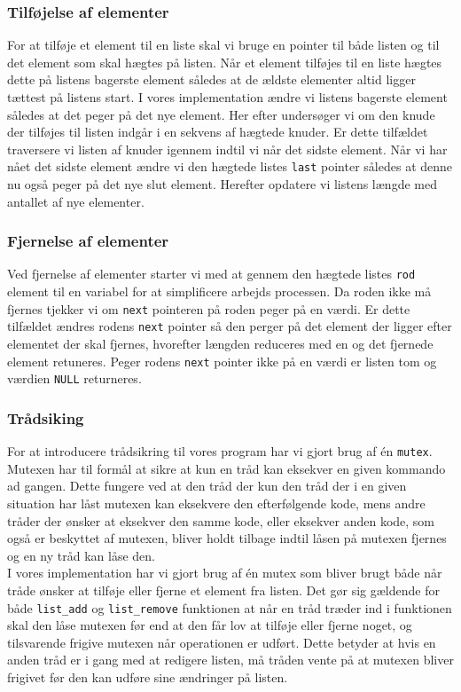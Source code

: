 \documentclass[main.tex]{subfile}
\begin{document}
\subsubsection{Tilføjelse af elementer}
For at tilføje et element til en liste skal vi bruge en pointer til både listen og til det element som skal hægtes på listen. Når et element tilføjes til en liste hægtes dette på listens bagerste element således at de ældste elementer altid ligger tættest på listens start. I vores implementation ændre vi listens bagerste element således at det peger på det nye element. Her efter undersøger vi om den knude der tilføjes til listen indgår i en sekvens af hægtede knuder. Er dette tilfældet traversere vi listen af knuder igennem indtil vi når det sidste element. Når vi har nået det sidste element ændre vi den hægtede listes \texttt{last} pointer således at denne nu også peger på det nye slut element. Herefter opdatere vi listens længde med antallet af nye elementer. 

\subsubsection{Fjernelse af elementer}
Ved fjernelse af elementer starter vi med at gennem den hægtede listes \texttt{rod} element til en variabel for at simplificere arbejds processen. Da roden ikke må fjernes tjekker vi om \texttt{next} pointeren på roden peger på en værdi. Er dette tilfældet ændres rodens \texttt{next} pointer så den perger på det element der ligger efter elementet der skal fjernes, hvorefter længden reduceres med en og det fjernede element retuneres. Peger rodens \texttt{next} pointer ikke på en værdi er listen tom og værdien \texttt{NULL} returneres.

\subsubsection{Trådsiking}
For at introducere trådsikring til vores program har vi gjort brug af én \texttt{mutex}. Mutexen har til formål at sikre at kun en tråd kan eksekver en given kommando ad gangen. Dette fungere ved at den tråd der kun den tråd der i en given situation har låst mutexen kan eksekvere den efterfølgende kode, mens andre tråder der ønsker at eksekver den samme kode, eller eksekver anden kode, som også er beskyttet af mutexen, bliver holdt tilbage indtil låsen på mutexen fjernes og en ny tråd kan låse den.\\

I vores implementation har vi gjort brug af én mutex som bliver brugt både når tråde ønsker at tilføje eller fjerne et element fra listen. Det gør sig gældende for både \texttt{list\_add} og \texttt{list\_remove} funktionen at når en tråd træder ind i funktionen skal den låse mutexen før end at den får lov at tilføje eller fjerne noget, og tilsvarende frigive mutexen når operationen er udført. Dette betyder at hvis en anden tråd er i gang med at redigere listen, må tråden vente på at mutexen bliver frigivet før den kan udføre sine ændringer på listen.\\
\end{document}
